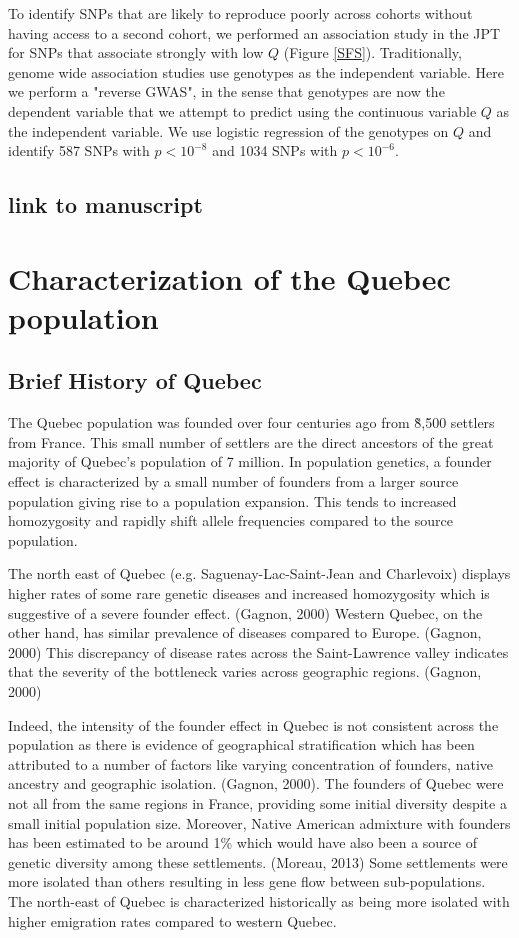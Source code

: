 \documentclass[
11pt, %
oneside, %
english, %
doublespacing, %
headsepline, %
]{MastersDoctoralThesis} %
\begin{document}
To identify SNPs that are likely to reproduce poorly across cohorts without having access to a second cohort, we performed an association study in the JPT for SNPs that associate strongly with low $Q$ (Figure \ref{SFS}).
Traditionally, genome wide association studies use genotypes as the independent variable. 
Here we perform a "reverse GWAS", in the sense that genotypes are now the dependent variable that we attempt to predict using the continuous variable $Q$ as the independent variable.
We use logistic regression of the genotypes on $Q$ and identify 587 SNPs with $p < 10^{-8}$ and 1034 SNPs with $ p < 10^{-6}$. 
\section{link to manuscript}

\chapter{Characterization of the Quebec population}

\section{Brief History of Quebec}
The Quebec population was founded over four centuries ago from \~8,500 settlers from France.
This small number of settlers are the direct ancestors of the great majority of Quebec's population of 7 million.
In population genetics, a founder effect is characterized by a small number of founders from a larger source population giving rise to a population expansion.
This tends to increased homozygosity and rapidly shift allele frequencies compared to the source population.

The north east of Quebec (e.g. Saguenay-Lac-Saint-Jean and Charlevoix) displays higher rates of some rare genetic diseases and increased homozygosity which is suggestive of a severe founder effect. (Gagnon, 2000)
Western Quebec, on the other hand, has similar prevalence of diseases compared to Europe. (Gagnon, 2000)
This discrepancy of disease rates across the Saint-Lawrence valley indicates that the severity of the bottleneck varies across geographic regions. (Gagnon, 2000)

Indeed, the intensity of the founder effect in Quebec is not consistent across the population as there is evidence of geographical stratification which has been attributed to a number of factors like varying concentration of founders, native ancestry and geographic isolation. (Gagnon, 2000).
The founders of Quebec were not all from the same regions in France, providing some initial diversity despite a small initial population size.
Moreover, Native American admixture with founders has been estimated to be around 1\% which would have also been a source of genetic diversity among these settlements. (Moreau, 2013)
Some settlements were more isolated than others resulting in less gene flow between sub-populations.
The north-east of Quebec is characterized historically as being more isolated with higher emigration rates compared to western Quebec.
\end{document}
